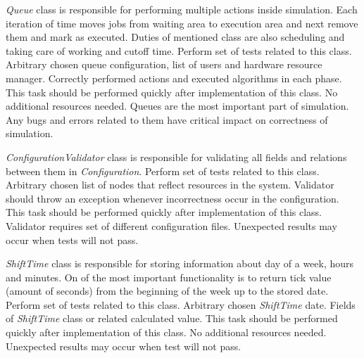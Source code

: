 	{
		{
			\emph{Queue} class is responsible for performing multiple actions inside simulation. Each iteration of time moves jobs from waiting area to execution area and next remove them and mark as executed. Duties of mentioned class are also scheduling and taking care of working and cutoff time.
		}
		{
			Perform set of tests related to this class. 
		}
		{
			Arbitrary chosen queue configuration, list of users and hardware resource manager.  
		}
		{
			Correctly performed actions and executed algorithms in each phase.
		}
		{
			This task should be performed quickly after implementation of this class.
		}
		{
			No additional resources needed.
		}
		{
			Queues are the most important part of simulation. Any bugs and errors related to them have critical impact on correctness of simulation.
		}
	}

	{
		{
			\emph{ConfigurationValidator} class is responsible for validating all fields and relations between them in \emph{Configuration}.
		}
		{
			Perform set of tests related to this class. 
		}
		{
			Arbitrary chosen list of nodes that reflect resources in the system.   
		}
		{
			Validator should throw an exception whenever incorrectness occur in the configuration.
		}
		{
			This task should be performed quickly after implementation of this class.
		}
		{
			Validator requires set of different configuration files.
		}
		{
			Unexpected results may occur when tests will not pass. 
		}
	}

	{
		{
			\emph{ShiftTime} class is responsible for storing information about day of a week, hours and minutes. On of the most important functionality is to return tick value (amount of seconds) from the beginning of the week up to the stored date.
		}
		{
			Perform set of tests related to this class. 
		}
		{
			Arbitrary chosen \emph{ShiftTime} date.   
		}
		{
			Fields of \emph{ShiftTime} class or related calculated value.
		}
		{
			This task should be performed quickly after implementation of this class.
		}
		{
			No additional resources needed.
		}
		{
			Unexpected results may occur when test will not pass. 
		}
	}

